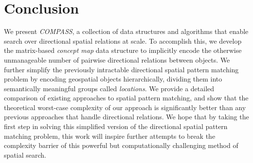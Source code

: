 \section{Conclusion}
\label{section:conclusion}
\normalsize
We present \emph{COMPASS}, a collection of data structures and algorithms that enable search over directional spatial relations at scale. 
%
To accomplish this, we develop the matrix-based \textit{concept map} data structure to implicitly encode the otherwise unmanageable number of pairwise directional relations between objects.
We further simplify the previously intractable directional spatial pattern matching problem by encoding geospatial objects hierarchically, dividing them into semantically meaningful groups called \textit{locations}. 
%
We provide a detailed comparison of existing approaches to spatial pattern matching, and show that the theoretical worst-case complexity of our approach is significantly better than any previous approaches that handle directional relations.
%
We hope that by taking the first step in solving this simplified version of the directional spatial pattern matching problem, this work will inspire further attempts to break the complexity barrier of this powerful but computationally challenging method of spatial search.


